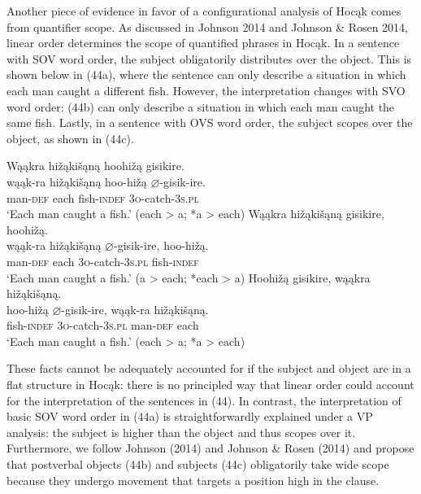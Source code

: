\documentclass[output=paper]{LSP/langsci}
\begin{document}
Another piece of evidence in favor of a configurational analysis of Hoc\k{a}k comes from quantifier scope. As discussed in Johnson 2014 and Johnson \& Rosen 2014, linear order determines the scope of quantified phrases in Hoc\k{a}k. In a sentence with SOV word order, the subject obligatorily distributes over the object. This is shown below in (44a), where the sentence can only describe a situation in which each man caught a different fish. However, the interpretation changes with SVO word order: (44b) can only describe a situation in which each man caught the same fish. Lastly, in a sentence with OVS word order, the subject scopes over the object, as shown in (44c).

\begin{exe}
\ex
\begin{xlist}
\ex 
\glll W\k{a}\k{a}kra	hi\v{z}\k{a}ki\v{s}\k{a}n\k{a}		hoohi\v{z}\k{a}	gisikire.\\
w\k{a}\k{a}k-ra		hi\v{z}\k{a}ki\v{s}\k{a}n\k{a}		hoo-hi\v{z}\k{a}	$\varnothing$-gisik-ire. \\
		man-\textsc{def}		each					fish-\textsc{indef}		\textsc{3o}-catch-\textsc{3s.pl} \\
\trans `Each man caught a fish.' (each > a; *a > each)
\ex 
\glll W\k{a}\k{a}kra		hi\v{z}\k{a}ki\v{s}\k{a}n\k{a}		gisikire,			hoohi\v{z}\k{a}.\\
w\k{a}\k{a}k-ra		hi\v{z}\k{a}ki\v{s}\k{a}n\k{a}		$\varnothing$-gisik-ire,	hoo-hi\v{z}\k{a}. \\
		man-\textsc{def}		each					\textsc{3o}-catch-\textsc{3s.pl}		fish-\textsc{indef} \\
\trans `Each man caught a fish.'  (a > each; *each > a)
\ex 
\glll Hoohi\v{z}\k{a}	gisikire,	w\k{a}\k{a}kra	 hi\v{z}\k{a}ki\v{s}\k{a}n\k{a}.\\
hoo-hi\v{z}\k{a}	$\varnothing$-gisik-ire,		w\k{a}\k{a}k-ra	hi\v{z}\k{a}ki\v{s}\k{a}n\k{a}. \\
		fish-\textsc{indef}		\textsc{3o}-catch-\textsc{3s.pl}		man-\textsc{def}		each \\
\trans `Each man caught a fish.' (each > a; *a > each)
\end{xlist}
\end{exe}

These facts cannot be adequately accounted for if the subject and object are in a flat structure in Hoc\k{a}k: there is no principled way that linear order could account for the interpretation of the sentences in (44). In contrast, the interpretation of basic SOV word order in (44a) is straightforwardly explained under a VP analysis: the subject is higher than the object and thus scopes over it. Furthermore, we follow Johnson (2014) and Johnson \& Rosen (2014) and propose that postverbal objects (44b) and subjects (44c) obligatorily take wide scope because they undergo movement that targets a position high in the clause. 
\end{document}
